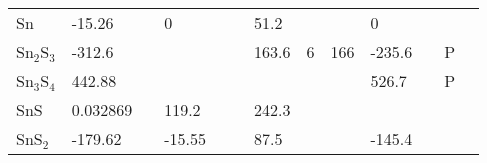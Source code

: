 \documentclass{article}
\begin{document}
\begin{center}
\begin{longtable}{|l|p{2.5cm}|l|p{2.5cm}|l|l|p{2.5cm}|l|l|p{2.5cm}|l|l|l|}
Sn               	   & -15.26                     & \citep{Barin1977} & 0                   &     & \citep{Haynes2013}     & 51.2               &     & \citep{Haynes2013} & 0                                   &     & \citep{Haynes2013} &  \\
Sn$_2$S$_3$        	   & -312.6                     & \citep{Barin1977} &                     &     &         & 163.6              & 6   & 166 & -235.6                              &     & P   &  \\
Sn$_3$S$_4$        	   & 442.88                     & \citep{Barin1977} &                     &     &         &                    &     &     & 526.7                               &     & P   &  \\
SnS              	   & 0.032869                   & \citep{Barin1977} & 119.2               &     & \citep{Wagman1982}     & 242.3              &     & 
\citep{Hellwege1984} &                                     &     &     &  \\
SnS$_2$           	   & -179.62                    & \citep{Barin1977} & -15.55              &     & \citep{Jackson1985}     & 87.5               &     & \citep{Jackson1985} & -145.4                            &     & \citep{Jackson1985} &  \\

\end{longtable}
\end{center}
\end{document}
